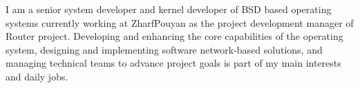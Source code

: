 \documentclass[12pt]{developercv}
\begin{document}
\begin{minipage}[t]{1\textwidth} %
I am a senior system developer and kernel developer of BSD based
operating systems currently working at ZharfPouyan as the project
development manager of Router project.
Developing and enhancing the core capabilities of the operating system,
designing and implementing software network-based solutions, and managing
technical teams to advance project goals is part of my main interests and
daily jobs.

\end{minipage}
\hfill %
%
\end{document}
